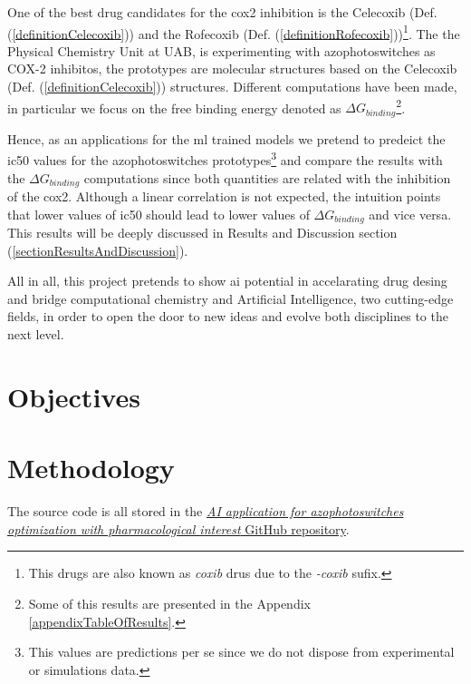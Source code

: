\documentclass[11pt]{article}
\begin{document}
One of the best drug candidates for the \gls{cox2} inhibition is the Celecoxib (Def. (\ref{definitionCelecoxib})) and the Rofecoxib (Def. (\ref{definitionRofecoxib}))\footnote{This drugs are also known as \emph{coxib} drus due to the \emph{-coxib} sufix.}. The the Physical Chemistry Unit at UAB\cite{UAB_ComputationalChemistry}, is experimenting with azophotoswitches as COX-2 inhibitos, the prototypes are molecular structures based on the Celecoxib (Def. (\ref{definitionCelecoxib})) structures. Different computations have been made, in particular we focus on the free binding energy denoted as $\Delta G_{binding}$\footnote{Some of this results are presented in the Appendix \ref{appendixTableOfResults}.}. 

Hence, as an applications for the \gls{ml} trained models we pretend to predeict the \gls{ic50} values for the azophotoswitches prototypes\footnote{This values are predictions per se since we do not dispose from experimental or simulations data.} and compare the results with the $\Delta G_{binding}$ computations since both quantities are related with the inhibition of the \gls{cox2}. Although a linear correlation is not expected, the intuition points that lower values of \gls{ic50} should lead to lower values of $\Delta G_{binding}$ and vice versa. This results will be deeply discussed in Results and Discussion section (\ref{sectionResultsAndDiscussion}).

All in all, this project pretends to show \gls{ai} potential in accelarating drug desing and bridge computational chemistry and Artificial Intelligence, two cutting-edge fields, in order to open the door to new ideas and evolve both disciplines to the next level.

\newpage
\section{Objectives}


\newpage
\section{Methodology}
The source code is all stored in the \href{https://github.com/SirSergi0/Repository---AI-application-for-azophotoswitches-optimization-with-pharmacological-interest}{\emph{AI application for azophotoswitches optimization with pharmacological interest} GitHub repository}\cite{GitHub}.
\end{document}
